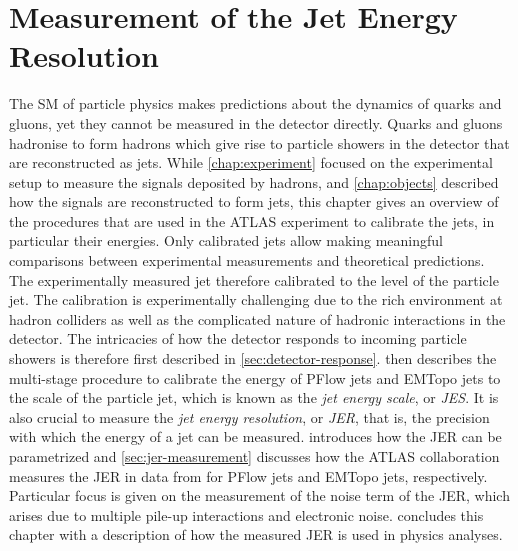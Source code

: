 \chapter{Measurement of the Jet Energy Resolution}
\label{chap:calibration}

The SM of particle physics makes predictions about the dynamics of quarks and gluons, yet they cannot be measured in the detector directly. Quarks and gluons hadronise to form hadrons which give rise to particle showers in the detector that are reconstructed as jets.
While \cref{chap:experiment} focused on the experimental setup to measure the signals deposited by hadrons, and \cref{chap:objects} described how the signals are reconstructed to form jets, this chapter gives an overview of the procedures that are used in the ATLAS experiment to calibrate the jets, in particular their energies. Only calibrated jets allow making meaningful comparisons between experimental measurements and theoretical predictions.
The experimentally measured jet therefore calibrated to the level of the particle jet. The calibration is experimentally challenging due to the rich environment at hadron colliders as well as the complicated nature of hadronic interactions in the detector. The intricacies of how the detector responds to incoming particle showers is therefore first described in \cref{sec:detector-response}.  then describes the multi-stage procedure to calibrate the energy of PFlow jets and EMTopo jets to the scale of the particle jet, which is known as the \emph{jet energy scale}, or \emph{JES}.
It is also crucial to measure the \emph{jet energy resolution}, or \emph{JER}, that is, the precision with which the energy of a jet can be measured.  introduces how the JER can be parametrized and \cref{sec:jer-measurement} discusses how the ATLAS collaboration measures the JER in data from \RunTwo for PFlow jets and EMTopo jets, respectively. Particular focus is given on the measurement of the noise term of the JER, which arises due to multiple pile-up interactions and electronic noise.  concludes this chapter with a description of how the measured JER is used in physics analyses.



